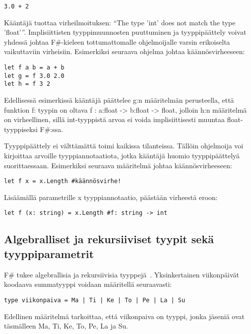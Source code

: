 \begin{lstlisting}
3.0 + 2
\end{lstlisting}

Kääntäjä tuottaa virheilmoituksen: “The type 'int' does not match the type 'float'”. Implisiittisten tyyppimuunnosten puuttuminen ja tyyppipäättely voivat yhdessä johtaa F\#-kieleen tottumattomalle ohjelmoijalle varsin erikoiselta vaikuttaviin virheisiin. Esimerkiksi seuraava ohjelma johtaa käännösvirheeseen:

\begin{lstlisting}
let f a b = a + b
let g = f 3.0 2.0
let h = f 3 2
\end{lstlisting}

Edellisessä esimerkissä kääntäjä päättelee g:n määritelmän perusteella, että funktion f: tyypin on oltava f : a:float -> b:float -> float, jolloin h:n määritelmä on virheellinen, sillä int-tyyppistä arvoa ei voida implisiittisesti muuntaa float-tyyppiseksi F\#:ssa.

Tyyppipäättely ei välttämättä toimi kaikissa tilanteissa. Tällöin ohjelmoija voi kirjoittaa arvoille tyyppiannotaatiota, jotka kääntäjä huomio tyyppipäättelyä suorittaessaan. Esimerkiksi seuraava määritelmä johtaa käännösvirheeseen:

\begin{lstlisting}
let f x = x.Length #käännösvirhe!
\end{lstlisting}

Lisäämällä parametrille x tyyppiannotaatio, päästään virheestä eroon:

\begin{lstlisting}
let f (x: string) = x.Length #f: string -> int
\end{lstlisting}


\subsection{Algebralliset ja rekursiiviset tyypit sekä tyyppiparametrit}

F\# tukee algebrallisia ja rekursiivisia tyyppejä~\cite{wiki_algebraic_data_type}. Yksinkertainen viikonpäivät koodaava summatyyppi voidaan määritellä seuraavasti:

\begin{lstlisting}
type viikonpaiva = Ma | Ti | Ke | To | Pe | La | Su
\end{lstlisting}

Edellinen määritelmä tarkoittaa, että viikonpaiva on tyyppi, jonka jäseniä ovat täsmälleen Ma, Ti, Ke, To, Pe, La ja Su.

